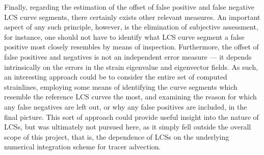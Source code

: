 Finally, regarding the estimation of the offset of false positive and false
negative LCS curve segments, there certainly exists other relevant measures.
An important aspect of any such principle, however, is the elimination of
subjective assessment, for instance, one should not have to identify
what LCS curve segment a false positive most closely resembles by means of
inspection. Furthermore, the offset of false positives and negatives is not
an independent error measure --- it depends intrinsically on the errors
in the strain eigenvalue and eigenvector fields. As such, an interesting
approach could be to consider the entire set of computed strainlines, employing
some means of identifying the curve segments which resemble the reference
LCS curves the most, and examining the reason for which any false negatives
are left out, or why any false positives are included, in the final picture.
This sort of approach could provide useful insight into the nature of LCSs, but
was ultimately not pursued here, as it simply fell outside the
overall scope of this project, that is, the dependence of LCSs on the
underlying numerical integration scheme for tracer advection.


